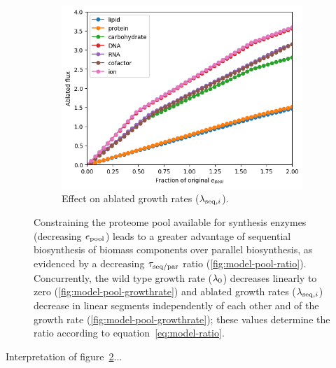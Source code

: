 \begin{figure}
\begin{subfigure}[htpb]{0.45\textwidth}
   \centering
   \includegraphics[width=\textwidth]{epool_ec_components}
   \caption{
     Effect on ablated growth rates ($\lambda_{\mathrm{seq},i}$).
   }
   \label{fig:model-pool-ablated}
  \end{subfigure}
  \caption{
    Constraining the proteome pool available for synthesis enzymes (decreasing $e_{\mathrm{pool}}$) leads to a greater advantage of sequential biosynthesis of biomass components over parallel biosynthesis, as evidenced by a decreasing $\tau_{\mathrm{seq}/\mathrm{par}}$ ratio (\ref{fig:model-pool-ratio}).
    Concurrently, the wild type growth rate ($\lambda_{0}$) decreases linearly to zero (\ref{fig:model-pool-growthrate}) and ablated growth rates ($\lambda_{\mathrm{seq},i}$) decrease in linear segments independently of each other and of the growth rate (\ref{fig:model-pool-growthrate}); these values determine the ratio according to equation~\ref{eq:model-ratio}.
  }
  \label{fig:model-pool}
\end{figure}


Interpretation of figure~\ref{fig:model-pool}...

